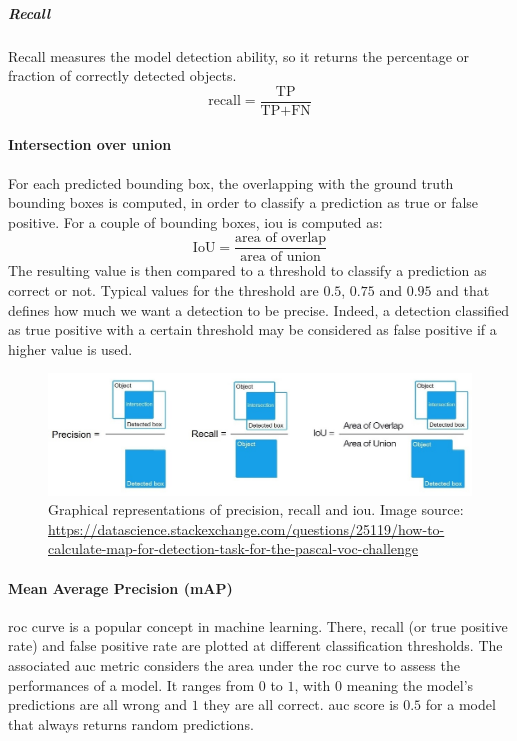 \documentclass[%
    corpo=12pt,
    twoside,
    stile=classica,   
    tipotesi=magistrale,
    evenboxes,
    english,
	numerazioneromana,
]{toptesi}
\begin{document}
\subparagraph{Recall}
Recall measures the model detection ability, so it returns the percentage or fraction of correctly detected objects.
\begin{equation}
	\text{recall} = \frac{\text{TP}}{\text{TP}+\text{FN}}
\end{equation}

\paragraph{Intersection over union}
For each predicted bounding box, the overlapping with the ground truth bounding boxes is computed, in order to classify a prediction as true or false positive. For a couple of bounding boxes, \gls{iou} is computed as:
\begin{equation}
	\text{IoU} = \frac{\text{area of overlap}}{\text{area of union}}
\end{equation}
The resulting value is then compared to a threshold to classify a prediction as correct or not. Typical values for the threshold are $0.5$, $0.75$ and $0.95$ and that defines how much we want a detection to be precise. Indeed, a detection classified as true positive with a certain threshold may be considered as false positive if a higher value is used.

\begin{figure}[t]
	\centering
	\includegraphics[width=\linewidth]{imgs/precision_recall_iou.jpg}
	\caption[Graphical representations of precision, recall and \gls{iou}]{Graphical representations of precision, recall and \gls{iou}. Image source: \url{https://datascience.stackexchange.com/questions/25119/how-to-calculate-map-for-detection-task-for-the-pascal-voc-challenge}}
	\label{fig:iou}
\end{figure}

\paragraph{Mean Average Precision (mAP)}
\gls{roc} curve is a popular concept in machine learning. There, recall (or true positive rate) and false positive rate are plotted at different classification thresholds. The associated \gls{auc} metric considers the area under the \gls{roc} curve to assess the performances of a model\cite{roc}. It ranges from $ 0 $ to $ 1 $, with $ 0 $ meaning the model's predictions are all wrong and $ 1 $ they are all correct. \Gls{auc} score is $ 0.5 $ for a model that always returns random predictions.
\end{document}
